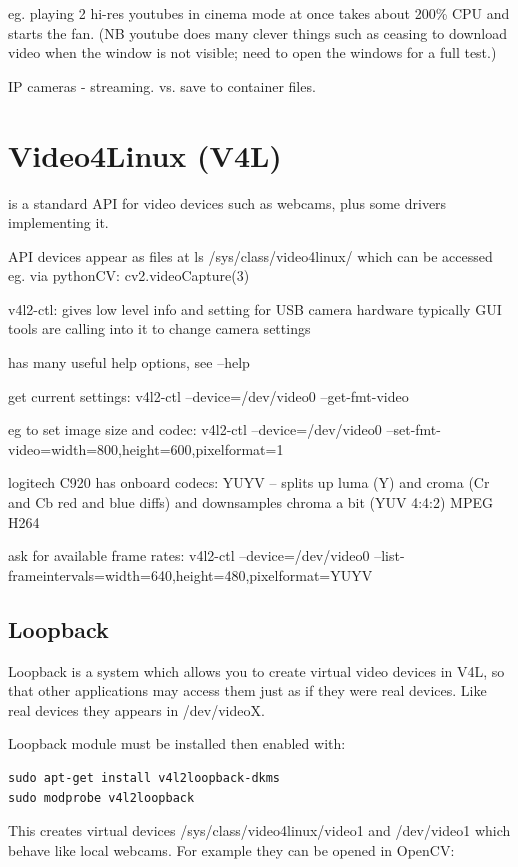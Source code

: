 \documentclass[oneside,english]{scrbook}
\begin{document}
eg. playing 2 hi-res youtubes in cinema mode at once takes about 200\% CPU and starts the fan. (NB youtube does many clever things such as ceasing to download video when the window is not visible; need to open the windows for a full test.)

IP cameras - streaming.  vs. save to container files.

\chapter{Video4Linux (V4L)}

is a standard API for video devices such as webcams, plus some drivers
implementing it.

API devices appear as files at ls /sys/class/video4linux/ which can
be accessed eg. via pythonCV: cv2.videoCapture(3) 

v4l2-ctl: gives low level info and setting for USB camera hardware
typically GUI tools are calling into it to change camera settings

has many useful help options, see --help 

get current settings: v4l2-ctl --device=/dev/video0 --get-fmt-video

eg to set image size and codec: v4l2-ctl --device=/dev/video0 --set-fmt-video=width=800,height=600,pixelformat=1

logitech C920 has onboard codecs: YUYV -- splits up luma (Y) and croma
(Cr and Cb red and blue diffs) and downsamples chroma a bit (YUV 4:4:2)
MPEG H264

ask for available frame rates: v4l2-ctl --device=/dev/video0 --list-frameintervals=width=640,height=480,pixelformat=YUYV


\section{Loopback}
\label{loopback}

Loopback is a system which allows you to create virtual video devices
in V4L, so that other applications may access them just as if they
were real devices. Like real devices they appears in /dev/videoX.

Loopback module must be installed then enabled with:

\begin{lstlisting}
sudo apt-get install v4l2loopback-dkms 
sudo modprobe v4l2loopback
\end{lstlisting}
This creates virtual devices /sys/class/video4linux/video1 and /dev/video1 which behave like local webcams. For example they can be opened in OpenCV:
\end{document}
